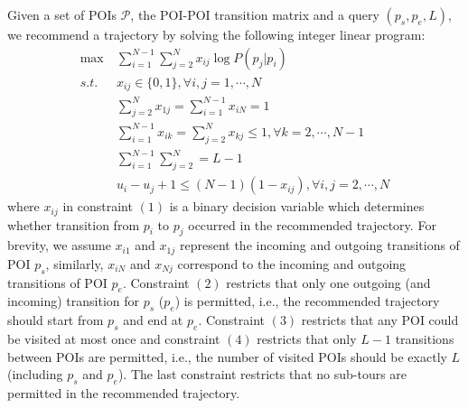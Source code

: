Given a set of POIs $\mathcal{P}$, the POI-POI transition matrix and a query $(p_s, p_e, L)$,
we recommend a trajectory by solving the following integer linear program:
\begin{align}
\max ~& \sum_{i=1}^{N-1} \sum_{j=2}^N x_{ij} \log P(p_j | p_i) \nonumber \\
s.t. ~& x_{ij} \in \{0, 1\}, \forall i, j = 1, \cdots, N \\
     & \sum_{j=2}^N x_{1j} = \sum_{i=1}^{N-1} x_{iN} = 1 \\
     & \sum_{i=1}^{N-1} x_{ik} = \sum_{j=2}^N x_{kj} \le 1, \forall k=2, \cdots, N-1 \\
     & \sum_{i=1}^{N-1} \sum_{j=2}^N = L-1 \\
     & u_i - u_j + 1 \le (N-1) (1-x_{ij}), \forall i, j = 2, \cdots, N
\end{align}
where $x_{ij}$ in constraint $(1)$ is a binary decision variable which determines whether transition from $p_i$ to $p_j$
occurred in the recommended trajectory.
For brevity, we assume $x_{i1}$ and $x_{1j}$ represent the incoming and outgoing transitions of POI $p_s$,
similarly, $x_{iN}$ and $x_{Nj}$ correspond to the incoming and outgoing transitions of POI $p_e$.
Constraint $(2)$ restricts that only one outgoing (and incoming) transition for $p_s$ ($p_e$)
is permitted, i.e., the recommended trajectory should start from $p_s$ and end at $p_e$.
Constraint $(3)$ restricts that any POI could be visited at most once and constraint $(4)$
restricts that only $L-1$ transitions between POIs are permitted, i.e., the number of visited POIs should be
exactly $L$ (including $p_s$ and $p_e$).
The last constraint restricts that no sub-tours are permitted in the recommended trajectory.
